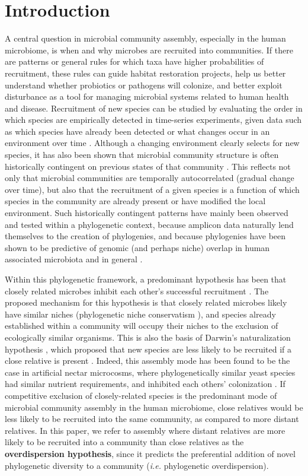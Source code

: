 \documentclass{article}
\begin{document}
{\parindent0pt \section{Introduction}}
A central question in microbial community assembly, especially in the human microbiome,  is when and why microbes are recruited into communities. If there are patterns or general rules for which taxa have higher probabilities of recruitment, these rules can guide habitat restoration projects, help us better understand whether probiotics or pathogens will colonize, and better exploit disturbance as a tool for managing microbial systems related to human health and disease.  Recruitment of new species can be studied by evaluating the order in which species are empirically detected in time-series experiments, given data such as which species have already been detected or what changes occur in an environment over time \cite{Nemergut2013,Sprockett2018}. Although a changing environment clearly selects for new species, it has also been shown that microbial community structure is often historically contingent on previous states of that community \cite{Nemergut2013,Fukami2015,Sprockett2018,Verster2018,Litvak2019}. This reflects not only that microbial communities are temporally autocorrelated (gradual change over time), but also that the recruitment of a given species is a function of which species in the community are already present or have modified the local environment. Such historically contingent patterns have mainly been observed and tested within a phylogenetic context, because amplicon data naturally lend themselves to the creation of phylogenies, and because phylogenies have been shown to be predictive of genomic (and perhaps niche) overlap in human associated microbiota \cite{Zaneveld2010,Langille2013} and in general \cite{Wiens2010,Pyron2015}.
\par
Within this phylogenetic framework, a predominant hypothesis has been that closely related microbes inhibit each other’s successful recruitment \cite{Nemergut2013,Fukami2015,Verster2018}. The proposed mechanism for this hypothesis is that closely related microbes likely have similar niches (phylogenetic niche conservatism \cite{Losos2008,Wiens2010,Pyron2015}), and species already established within a community will occupy their niches to the exclusion of ecologically similar organisms. This is also the basis of Darwin’s naturalization hypothesis \cite{Darwin1859}, which proposed that new species are less likely to be recruited if a close relative is present \cite{Ma2016}. Indeed, this assembly mode has been found to be the case in artificial nectar microcosms, where phylogenetically similar yeast species had similar nutrient requirements, and inhibited each others’ colonization \cite{Peay2012}. If competitive exclusion of closely-related species is the predominant mode of microbial community assembly in the human microbiome, close relatives would be less likely to be recruited into the same community, as compared to more distant relatives. In this paper, we refer to assembly where distant relatives are more likely to be recruited into a community than close relatives as the \textbf{overdispersion hypothesis}, since it predicts the preferential addition of novel phylogenetic diversity to a community (\emph{i.e.} phylogenetic overdispersion).
\end{document}
